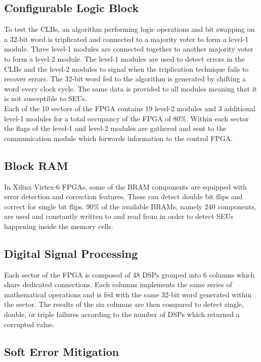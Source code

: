     \subsection{Configurable Logic Block}

      To test the CLBs, an algorithm performing logic operations and bit swapping on a 32-bit word is triplicated and connected to a majority voter to form a level-1 module. Three level-1 modules are connected together to another majority voter to form a level-2 module. The level-1 modules are used to detect errors in the CLBs and the level-2 modules to signal when the triplication technique fails to recover errors. The 32-bit word fed to the algorithm is generated by shifting a word every clock cycle. The same data is provided to all modules meaning that it is not susceptible to SEUs. \\

      Each of the 10 sectors of the FPGA contains 19 level-2 modules and 3 additional level-1 modules for a total occupancy of the FPGA of 80\%. Within each sector the flags of the level-1 and level-2 modules are gathered and sent to the communication module which forwards information to the control FPGA.

    \subsection{Block RAM}

      In Xilinx Virtex-6 FPGAs, some of the BRAM components are equipped with error detection and correction features. These can detect double bit flips and correct for single bit flips. 90\% of the available BRAMs, namely 240 components, are used and constantly written to and read from in order to detect SEUs happening inside the memory cells.

    \subsection{Digital Signal Processing}

      Each sector of the FPGA is composed of 48 DSPs grouped into 6 columns which share dedicated connections. Each columns implements the same series of mathematical operations and is fed with the same 32-bit word generated within the sector. The results of the six columns are then compared to detect single, double, or triple failures according to the number of DSPs which returned a corrupted value.

    \subsection{Soft Error Mitigation}

